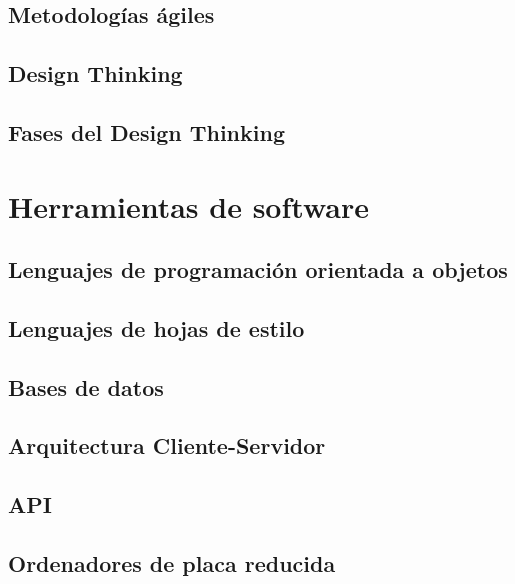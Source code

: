 \subsection{Metodologías ágiles}

\subsection{Design Thinking}

\subsection{Fases del Design Thinking}


\section{Herramientas de software}

\subsection{Lenguajes de programación orientada a objetos}

\subsection{Lenguajes de hojas de estilo}

\subsection{Bases de datos}

\subsection{Arquitectura Cliente-Servidor}

\subsection{API}

\subsection{Ordenadores de placa reducida}



 




